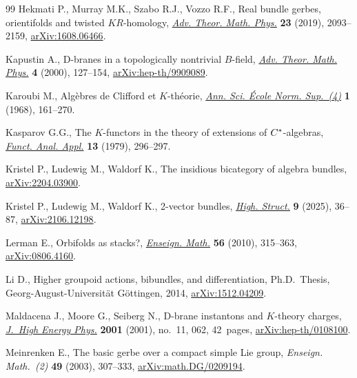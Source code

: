 \documentclass[pdftex]{sigma}
\numberwithin{equation}{section}
\begin{document}
\begin{thebibliography}{99}
Hekmati P., Murray M.K., Szabo R.J., Vozzo R.F., Real bundle gerbes,
 orientifolds and twisted {$KR$}-homology,
 \href{https://doi.org/10.4310/atmp.2019.v23.n8.a5}{\textit{Adv. Theor. Math.
 Phys.}} \textbf{23} (2019), 2093--2159,
 \href{http://arxiv.org/abs/1608.06466}{arXiv:1608.06466}.

Kapustin A., D-branes in a topologically nontrivial {$B$}-field,
 \href{https://doi.org/10.4310/ATMP.2000.v4.n1.a3}{\textit{Adv. Theor. Math.
 Phys.}} \textbf{4} (2000), 127--154,
 \href{http://arxiv.org/abs/hep-th/9909089}{arXiv:hep-th/9909089}.

Karoubi M., Alg\`ebres de {C}lifford et {$K$}-th\'eorie,
 \href{https://doi.org/10.24033/asens.1163}{\textit{Ann. Sci. \'{E}cole Norm.
 Sup.~(4)}} \textbf{1} (1968), 161--270.

Kasparov G.G., The {$K$}-functors in the theory of extensions of {$C\sp{\ast}
 $}-algebras, \href{https://doi.org/10.1007/BF01078376}{\textit{Funct. Anal.
 Appl.}} \textbf{13} (1979), 296--297.

Kristel P., Ludewig M., Waldorf K., The insidious bicategory of algebra
 bundles, \href{http://arxiv.org/abs/2204.03900}{arXiv:2204.03900}.

Kristel P., Ludewig M., Waldorf K., 2-vector bundles,
 \href{https://doi.org/10.21136/HS.2025.02}{\textit{High. Struct.}} \textbf{9}
 (2025), 36--87, \href{http://arxiv.org/abs/2106.12198}{arXiv:2106.12198}.

Lerman E., Orbifolds as stacks?,
 \href{https://doi.org/10.4171/LEM/56-3-4}{\textit{Enseign. Math.}}
 \textbf{56} (2010), 315--363,
 \href{http://arxiv.org/abs/0806.4160}{arXiv:0806.4160}.

Li D., Higher groupoid actions, bibundles, and differentiation, Ph.D.~Thesis,
 {G}eorg-{A}ugust-{U}niversit\"at G\"ottingen, 2014,
 \href{http://arxiv.org/abs/1512.04209}{arXiv:1512.04209}.

Maldacena J., Moore G., Seiberg N., D-brane instantons and {$K$}-theory
 charges, \href{https://doi.org/10.1088/1126-6708/2001/11/062}{\textit{J.~High
 Energy Phys.}} \textbf{2001} (2001), no.~11, 062, 42~pages,
 \href{http://arxiv.org/abs/hep-th/0108100}{arXiv:hep-th/0108100}.

Meinrenken E., The basic gerbe over a compact simple {L}ie group,
 \textit{Enseign. Math.~(2)} \textbf{49} (2003), 307--333,
 \href{http://arxiv.org/abs/math.DG/0209194}{arXiv:math.DG/0209194}.


\end{thebibliography}
\end{document}
